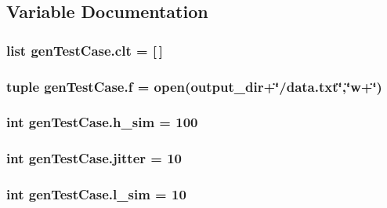 \subsection{Variable Documentation}
\hypertarget{namespacegenTestCase_aeedf530d2d45ab93335c9416ff8b7c14}{
\subsubsection[{clt}]{\setlength{\rightskip}{0pt plus 5cm}list gen\-Test\-Case.\-clt = \mbox{[}$\,$\mbox{]}}}\label{namespacegenTestCase_aeedf530d2d45ab93335c9416ff8b7c14}
\hypertarget{namespacegenTestCase_a9ca5030599b19855db5987a41590e693}{
\subsubsection[{f}]{\setlength{\rightskip}{0pt plus 5cm}tuple gen\-Test\-Case.\-f = open({\bf output\-\_\-dir}+\char`\"{}/data.\-txt\char`\"{},\char`\"{}w+\char`\"{})}}\label{namespacegenTestCase_a9ca5030599b19855db5987a41590e693}
\hypertarget{namespacegenTestCase_a2552790ec7ff21584332bf7e69ed692d}{
\subsubsection[{h\-\_\-sim}]{\setlength{\rightskip}{0pt plus 5cm}int gen\-Test\-Case.\-h\-\_\-sim = 100}}\label{namespacegenTestCase_a2552790ec7ff21584332bf7e69ed692d}
\hypertarget{namespacegenTestCase_ad5df9b35e01c29801872e92ff16b6dff}{
\subsubsection[{jitter}]{\setlength{\rightskip}{0pt plus 5cm}int gen\-Test\-Case.\-jitter = 10}}\label{namespacegenTestCase_ad5df9b35e01c29801872e92ff16b6dff}
\hypertarget{namespacegenTestCase_aa9c42bf08976665edc7dd18af7f77f3b}{
\subsubsection[{l\-\_\-sim}]{\setlength{\rightskip}{0pt plus 5cm}int gen\-Test\-Case.\-l\-\_\-sim = 10}}\label{namespacegenTestCase_aa9c42bf08976665edc7dd18af7f77f3b}
